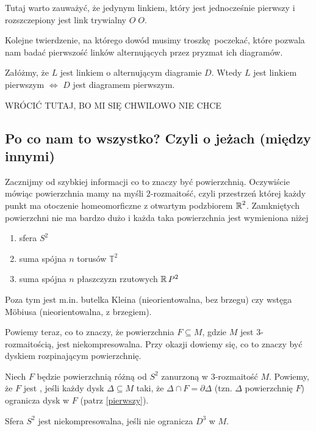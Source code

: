 \documentclass{article}
\begin{document}
Tutaj warto zauważyć, że jedynym linkiem, który jest jednocześnie pierwszy i rozszczepiony jest link trywialny $O\;O$.

Kolejne twierdzenie, na którego dowód musimy troszkę poczekać, które pozwala nam badać pierwszość linków alternujących przez pryzmat ich diagramów.
\begin{thm}
  Załóżmy, że $L$ jest linkiem o alternującym diagramie $D$. Wtedy $L$ jest linkiem pierwszym $\iff$ $D$ jest diagramem pierwszym.
\end{thm}

{\large\color{red}WRÓCIĆ TUTAJ, BO MI SIĘ CHWILOWO NIE CHCE}

\subsection{Po co nam to wszystko? Czyli o jeżach (między innymi)}

Zacznijmy od szybkiej informacji co to znaczy być powierzchnią. Oczywiście mówiąc powierzchnia mamy na myśli $2$-rozmaitość, czyli przestrzeń której każdy punkt ma otoczenie homeomorficzne z otwartym podzbiorem $\operatorname{\mathbb{R}}^2$. Zamkniętych powierzchni nie ma bardzo dużo i każda taka powierzchnia jest wymieniona niżej
\begin{enumerate}
  \item sfera $S^2$
  \item suma spójna $n$ torusów $\mathbb{T}^2$
  \item suma spójna $n$ płaszczyzn rzutowych $\operatorname{\mathbb{R}} P^2$
\end{enumerate}
Poza tym jest m.in. butelka Kleina (nieorientowalna, bez brzegu) czy wstęga M\"obiusa (nieorientowalna, z brzegiem).

Powiemy teraz, co to znaczy, że powierzchnia $F\subseteq M$, gdzie $M$ jest $3$-rozmaitością, jest niekompresowalna. Przy okazji dowiemy się, co to znaczy być dyskiem rozpinającym powierzchnię.

\begin{deff} 
  Niech $F$ będzie powierzchnią różną od $S^2$ zanurzoną w $3$-rozmaitość $M$. Powiemy, że $F$ jest , jeśli każdy dysk $\Delta\subseteq M$ taki, że $\Delta\cap F=\partial\Delta$ (tzn. $\Delta$  powierzchnię $F$) ogranicza dysk w $F$ (patrz \cref{pierwszy}).

  Sfera $S^2$ jest niekompresowalna, jeśli nie ogranicza $D^3$ w $M$.
\end{deff}
\end{document}
